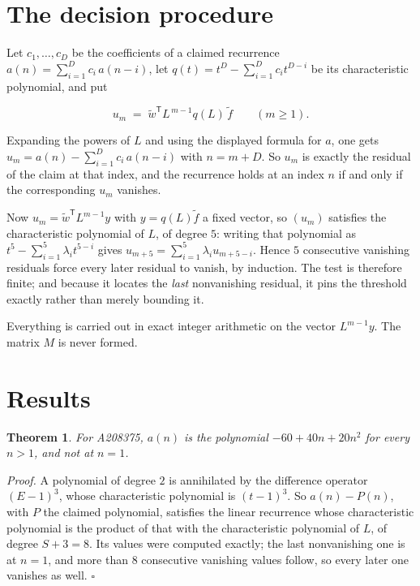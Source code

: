 \documentclass[11pt]{article}
\newtheorem{theorem}{Theorem}
\theoremstyle{definition}
\begin{document}
\section{The decision procedure}

Let $c_1,\dots,c_D$ be the coefficients of a claimed recurrence $a(n) = \sum_{i=1}^{D} c_i\,a(n-i)$, let $q(t) = t^{D} - \sum_{i=1}^{D} c_i t^{D-i}$ be its characteristic polynomial, and put

\[u_m \;=\; \tilde w^{\mathsf T} L^{\,m-1} q(L)\,\tilde f \qquad (m \ge 1).\]

Expanding the powers of $L$ and using the displayed formula for $a$, one gets $u_m = a(n) - \sum_{i=1}^{D} c_i\,a(n-i)$ with $n = m + D$. So $u_m$ is exactly the residual of the claim at that index, and the recurrence holds at an index $n$ if and only if the corresponding $u_m$ vanishes.

Now $u_m = \tilde w^{\mathsf T} L^{m-1} y$ with $y = q(L)\tilde f$ a fixed vector, so $(u_m)$ satisfies the characteristic polynomial of $L$, of degree $5$: writing that polynomial as $t^{5} - \sum_{i=1}^{5} \lambda_i t^{5-i}$ gives $u_{m+5} = \sum_{i=1}^{5} \lambda_i u_{m+5-i}$. Hence $5$ consecutive vanishing residuals force every later residual to vanish, by induction. The test is therefore finite; and because it locates the {\itshape last} nonvanishing residual, it pins the threshold exactly rather than merely bounding it.

Everything is carried out in exact integer arithmetic on the vector $L^{m-1}y$. The matrix $M$ is never formed.

\section{Results}

\begin{theorem} For A208375, $a(n)$ is the polynomial $-60 + 40n + 20n^{2}$ for every $n > 1$, and not at $n = 1$.\end{theorem}

{\itshape Proof.} A polynomial of degree $2$ is annihilated by the difference operator $(E-1)^{3}$, whose characteristic polynomial is $(t-1)^{3}$. So $a(n) - P(n)$, with $P$ the claimed polynomial, satisfies the linear recurrence whose characteristic polynomial is the product of that with the characteristic polynomial of $L$, of degree $S + 3 = 8$. Its values were computed exactly; the last nonvanishing one is at $n = 1$, and more than $8$ consecutive vanishing values follow, so every later one vanishes as well. $\square$
\end{document}
